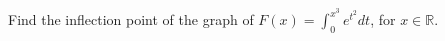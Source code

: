 Find the inflection point of the graph of $F(x) = \displaystyle{\int_{0}^{x^3}
e^{t^2} dt}$, for $x \in \mathbb{R}$.
